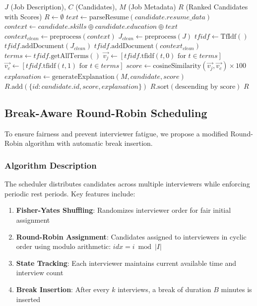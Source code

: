 \documentclass[conference]{IEEEtran}
\begin{document}
\begin{algorithm}
\caption{AI Candidate Shortlisting}
\label{alg:shortlist}
\begin{algorithmic}[1]
\REQUIRE $J$ (Job Description), $C$ (Candidates), $M$ (Job Metadata)
\ENSURE $R$ (Ranked Candidates with Scores)
\STATE $R \leftarrow \emptyset$
    \STATE $text \leftarrow \text{parseResume}(candidate.resume\_data)$
    \STATE $context \leftarrow candidate.skills \oplus candidate.education \oplus text$
    \STATE $context_{clean} \leftarrow \text{preprocess}(context)$
    \STATE $J_{clean} \leftarrow \text{preprocess}(J)$
    \STATE $tfidf \leftarrow \text{TfIdf}()$
    \STATE $tfidf.\text{addDocument}(J_{clean})$
    \STATE $tfidf.\text{addDocument}(context_{clean})$
    \STATE $terms \leftarrow tfidf.\text{getAllTerms}()$
    \STATE $\vec{v_j} \leftarrow [tfidf.\text{tfidf}(t, 0) \text{ for } t \in terms]$
    \STATE $\vec{v_c} \leftarrow [tfidf.\text{tfidf}(t, 1) \text{ for } t \in terms]$
    \STATE $score \leftarrow \text{cosineSimilarity}(\vec{v_j}, \vec{v_c}) \times 100$
    \STATE $explanation \leftarrow \text{generateExplanation}(M, candidate, score)$
    \STATE $R.\text{add}(\{id: candidate.id, score, explanation\})$
\ENDFOR
\STATE $R.\text{sort}(\text{descending by score})$
\RETURN $R$
\end{algorithmic}
\end{algorithm}

\subsection{Break-Aware Round-Robin Scheduling}

To ensure fairness and prevent interviewer fatigue, we propose a modified Round-Robin algorithm with automatic break insertion.

\subsubsection{Algorithm Description}

The scheduler distributes candidates across multiple interviewers while enforcing periodic rest periods. Key features include:

\begin{enumerate}
    \item \textbf{Fisher-Yates Shuffling}: Randomizes interviewer order for fair initial assignment
    \item \textbf{Round-Robin Assignment}: Candidates assigned to interviewers in cyclic order using modulo arithmetic: $idx = i \bmod |I|$
    \item \textbf{State Tracking}: Each interviewer maintains current available time and interview count
    \item \textbf{Break Insertion}: After every $k$ interviews, a break of duration $B$ minutes is inserted
\end{enumerate}
\end{document}
